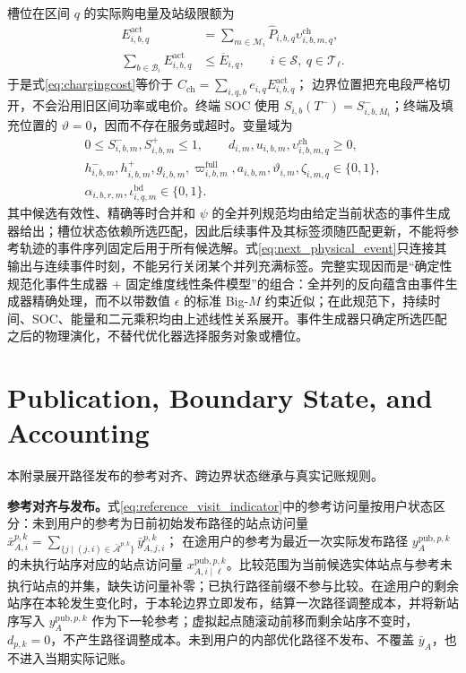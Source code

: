 \documentclass[12pt,a4paper,UTF8]{ctexart}
\begin{document}
槽位在区间 $q$ 的实际购电量及站级限额为
\begin{subequations}
\label{eq:event_interval_energy}
\begin{align}
E_{i,b,q}^{\mathrm{act}}
&=\sum_{m\in\mathcal M_i}
\widehat P_{i,b,q}
\upsilon_{i,b,m,q}^{\mathrm{ch}},\\
\sum_{b\in\mathcal B_i}E_{i,b,q}^{\mathrm{act}}
&\le\overline E_{i,q},
\qquad i\in\mathcal S,\ q\in\mathcal T_\ell.
\end{align}
\end{subequations}
于是式\eqref{eq:chargingcost}等价于
$C_{\mathrm{ch}}=\sum_{i,q,b}e_{i,q}E_{i,b,q}^{\mathrm{act}}$；
边界位置把充电段严格切开，不会沿用旧区间功率或电价。终端 SOC 使用
$S_{i,b}(T^-)=S_{i,b,\overline M_i}^{-}$；终端及填充位置的 $\vartheta=0$，因而不存在服务或超时。变量域为
\[
\begin{gathered}
0\le S_{i,b,m}^{-},S_{i,b,m}^{+}\le1,
\qquad d_{i,m},u_{i,b,m},
\upsilon_{i,b,m,q}^{\mathrm{ch}}\ge0,\\
h_{i,b,m}^{-},h_{i,b,m}^{+},g_{i,b,m},
\varpi_{i,b,m}^{\mathrm{full}},a_{i,b,m},\vartheta_{i,m},
\zeta_{i,m,q}\in\{0,1\},\\
\alpha_{i,b,r,m},\iota_{i,q,m}^{\mathrm{bd}}
\in\{0,1\}.
\end{gathered}
\]
其中候选有效性、精确等时合并和 $\psi$ 的全并列规范均由给定当前状态的事件生成器给出；槽位状态依赖所选匹配，因此后续事件及其标签须随匹配更新，不能将参考轨迹的事件序列固定后用于所有候选解。式\eqref{eq:next_physical_event}只连接其输出与连续事件时刻，不能另行关闭某个并列充满标签。完整实现因而是“确定性规范化事件生成器 + 固定维度线性条件模型”的组合：全并列的反向蕴含由事件生成器精确处理，而不以带数值 $\epsilon$ 的标准 Big-$M$ 约束近似；在此规范下，持续时间、SOC、能量和二元乘积均由上述线性关系展开。事件生成器只确定所选匹配之后的物理演化，不替代优化器选择服务对象或槽位。



\section{Publication, Boundary State, and Accounting}
\label{app:accounting}

本附录展开路径发布的参考对齐、跨边界状态继承与真实记账规则。

\textbf{参考对齐与发布。}式\eqref{eq:reference_visit_indicator}中的参考访问量按用户状态区分：未到用户的参考为日前初始发布路径的站点访问量
$\bar x_{A,i}^{p,k}=\sum_{\{j\mid(j,i)\in\bar{\mathcal A}^{p,k}\}}\bar y_{A,j,i}^{p,k}$；
在途用户的参考为最近一次实际发布路径 $y_A^{\mathrm{pub},p,k}$ 的未执行站序对应的站点访问量 $x_{A,i\mid\ell}^{\mathrm{pub},p,k}$。比较范围为当前候选实体站点与参考未执行站点的并集，缺失访问量补零；已执行路径前缀不参与比较。在途用户的剩余站序在本轮发生变化时，于本轮边界立即发布，结算一次路径调整成本，并将新站序写入 $y_A^{\mathrm{pub},p,k}$ 作为下一轮参考；虚拟起点随滚动前移而剩余站序不变时，$d_{p,k}=0$，不产生路径调整成本。未到用户的内部优化路径不发布、不覆盖 $\bar y_A$，也不进入当期实际记账。
\end{document}
